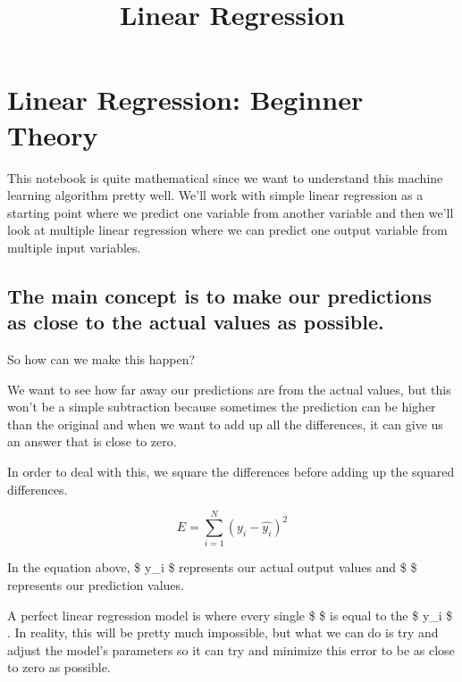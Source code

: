 \documentclass[11pt]{article}
\title{Linear Regression}
\begin{document}
    
    
    \maketitle
    
    

    
    \hypertarget{linear-regression-beginner-theory}{%
\section{Linear Regression: Beginner
Theory}\label{linear-regression-beginner-theory}}

    This notebook is quite mathematical since we want to understand this
machine learning algorithm pretty well. We'll work with simple linear
regression as a starting point where we predict one variable from
another variable and then we'll look at multiple linear regression where
we can predict one output variable from multiple input variables.

    \hypertarget{the-main-concept-is-to-make-our-predictions-as-close-to-the-actual-values-as-possible.}{%
\subsection{The main concept is to make our predictions as close to the
actual values as
possible.}\label{the-main-concept-is-to-make-our-predictions-as-close-to-the-actual-values-as-possible.}}

So how can we make this happen?

We want to see how far away our predictions are from the actual values,
but this won't be a simple subtraction because sometimes the prediction
can be higher than the original and when we want to add up all the
differences, it can give us an answer that is close to zero.

In order to deal with this, we square the differences before adding up
the squared differences.

\[ E = \sum_{i=1}^{N}{(y_i - \hat{y_i})^2} \]

    In the equation above, \$ y\_i \$ represents our actual output values
and \$  \$ represents our prediction values.

A perfect linear regression model is where every single \$  \$
is equal to the \$ y\_i \$ . In reality, this will be pretty much
impossible, but what we can do is try and adjust the model's parameters
so it can try and minimize this error to be as close to zero as
possible.
\end{document}
